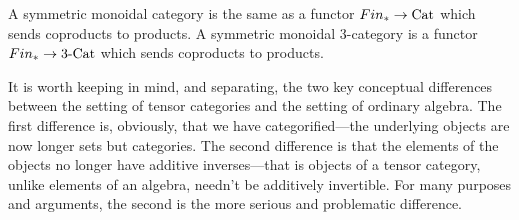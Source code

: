 \documentclass{amsart}
\begin{document}

A symmetric monoidal category is the same as a functor $Fin_* \to \mathrm{Cat}$ which sends coproducts to products. A symmetric monoidal 3-category is a functor $Fin_* \to 3\text{-}\mathrm{Cat}$ which sends coproducts to products.



\begin{remark}
It is worth keeping in mind, and separating, the two key conceptual differences between the setting of tensor categories and the setting of ordinary algebra.  The first difference is, obviously, that we have categorified---the underlying objects are now longer sets but categories.  The second difference is that the elements of the objects no longer have additive inverses---that is objects of a tensor category, unlike elements of an algebra, needn't be additively invertible.  For many purposes and arguments, the second is the more serious and problematic difference.
\end{remark}




\end{document}
